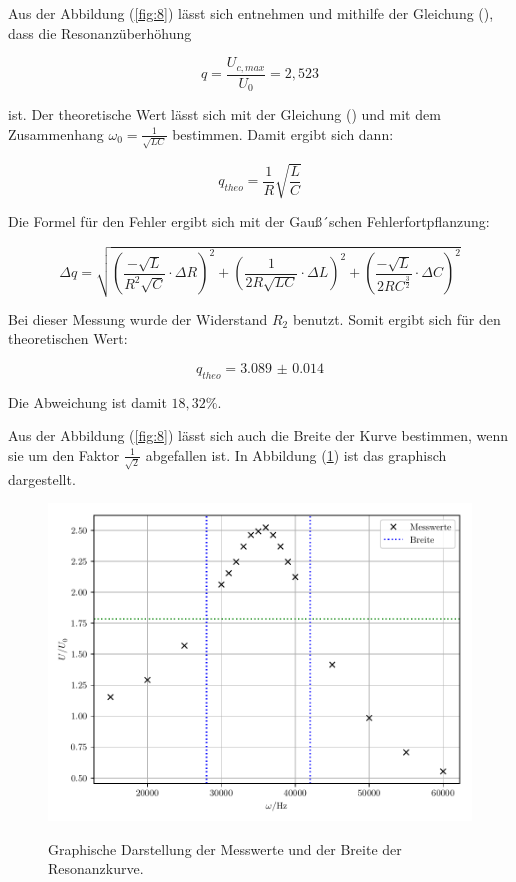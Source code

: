Aus der Abbildung (\ref{fig:8}) lässt sich entnehmen und mithilfe der Gleichung (),
dass die Resonanzüberhöhung

\begin{equation*}
  q = \frac{U_{c,max}}{U_0} = 2,523
\end{equation*}

ist. Der theoretische Wert lässt sich mit der Gleichung () und mit dem Zusammenhang
$\omega_0 = \frac{1}{\sqrt{LC}}$ bestimmen. Damit ergibt sich dann:

\begin{equation*}
  q_{theo} = \frac{1}{R} \sqrt{\frac{L}{C}}
\end{equation*}

Die Formel für den Fehler ergibt sich mit der Gauß´schen Fehlerfortpflanzung:

\begin{equation*}
  \Delta q = \sqrt{\left( \frac{-\sqrt{L}}{R^2\sqrt{C}} \cdot \Delta R \right)^2 +
  \left( \frac{1}{2R\sqrt{LC}} \cdot \Delta L \right)^2 +
  \left( \frac{-\sqrt{L}}{2RC^{\frac{3}{2}}} \cdot \Delta C \right)^2}
\end{equation*}

Bei dieser Messung wurde der Widerstand $R_2$ benutzt. Somit ergibt sich für den theoretischen
Wert:

\begin{equation*}
  q_{theo} = \num{3.089(14)}
\end{equation*}

Die Abweichung ist damit $18,32\% $.

Aus der Abbildung (\ref{fig:8}) lässt sich auch die Breite der Kurve bestimmen, wenn sie
um den Faktor $\frac{1}{\sqrt{2}}$ abgefallen ist. In Abbildung (\ref{fig:9}) ist das
graphisch dargestellt.

\begin{figure}[H]
  \centering
  \caption{Graphische Darstellung der Messwerte und der Breite der Resonanzkurve.}
  \includegraphics[width=\textwidth]{plot3.pdf}
  \label{fig:9}
\end{figure}

